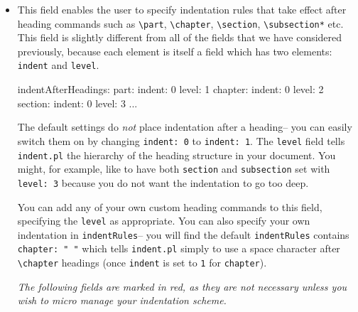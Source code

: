 \begin{itemize}
 		\item[\verbitem{indentAfterHeadings}] This field enables the user to specify 
 		indentation rules that take effect after heading commands such as \lstinline!\part!, \lstinline!\chapter!, 
 		\lstinline!\section!, \lstinline!\subsection*! etc. This field is slightly different from all 
 		of the fields that we have considered previously, because each element is 
 		itself a field which has two elements: \lstinline!indent! and \lstinline!level!.
 		\begin{yaml}[caption={\lstinline!indentAfterHeadings!},label={lst:indentAfterHeadings}]
indentAfterHeadings:
    part:
       indent: 0
       level: 1
    chapter: 
       indent: 0
       level: 2
    section:
       indent: 0
       level: 3
    ...
 		\end{yaml}
 		The default settings do \emph{not} place indentation after a heading-- you 
 		can easily switch them on by changing \lstinline!indent: 0! to \lstinline!indent: 1!.
 		The \lstinline!level! field tells \lstinline!indent.pl! the hierarchy of the heading 
 		structure in your document. You might, for example, like to have both \lstinline!section!
 		and \lstinline!subsection! set with \lstinline!level: 3! because you do not want the indentation to go too deep. 
 		 		 		
 		You can add any of your own custom heading commands to this field, specifying the \lstinline!level!
 		as appropriate.  You can also specify your own indentation in \lstinline!indentRules!-- 
 		you will find the default \lstinline!indentRules! contains \lstinline!chapter: " "! which 
 		tells \lstinline!indent.pl! simply to use a space character after \lstinline!\chapter! headings 
 		(once \lstinline!indent! is set to \lstinline!1! for \lstinline!chapter!).
 		\begin{warning}
 			\emph{The following fields are marked in red, as they are not necessary
 			unless you wish to micro manage your indentation scheme.}
 		\end{warning}
 		 		 		 		 					

\end{itemize}
